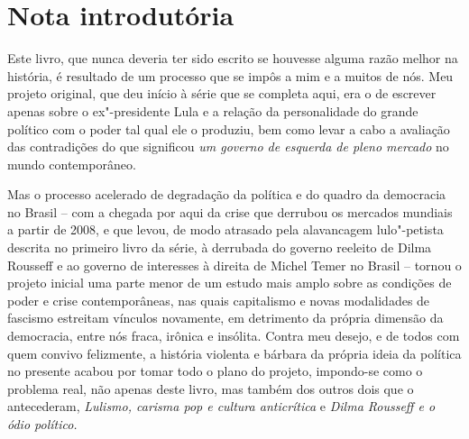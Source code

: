 















\chapter{Nota introdutória}

Este livro, que nunca deveria ter sido escrito se houvesse alguma razão
melhor na história, é resultado de um processo que se impôs a mim e a
muitos de nós. Meu projeto original, que deu início à série que se
completa aqui, era o de escrever apenas sobre o ex"-presidente Lula e a
relação da personalidade do grande político com o poder tal qual ele o
produziu, bem como levar a cabo a avaliação das contradições do
que significou \emph{um governo de esquerda de pleno mercado} no mundo
contemporâneo.

Mas o processo acelerado de degradação da política e do quadro da
democracia no Brasil -- com a chegada por aqui da crise
que derrubou os mercados mundiais a partir de 2008, e que
levou, de modo atrasado pela alavancagem lulo"-petista
descrita no primeiro livro da série, à derrubada do governo reeleito de
Dilma Rousseff e ao governo de interesses à direita de Michel Temer no
Brasil -- tornou o projeto inicial uma parte menor de um estudo mais amplo
sobre as condições de poder e crise contemporâneas, nas quais
capitalismo e novas modalidades de fascismo estreitam vínculos
novamente, em detrimento da própria dimensão da democracia, entre nós
fraca, irônica e insólita. Contra meu desejo, e de todos com quem
convivo felizmente, a história violenta e bárbara da própria ideia da
política no presente acabou por tomar todo o plano do projeto,
impondo-se como o problema real, não apenas deste livro, mas também dos
outros dois que o antecederam, \emph{Lulismo, carisma pop e cultura
anticrítica} e \emph{Dilma Rousseff e o ódio político. }

